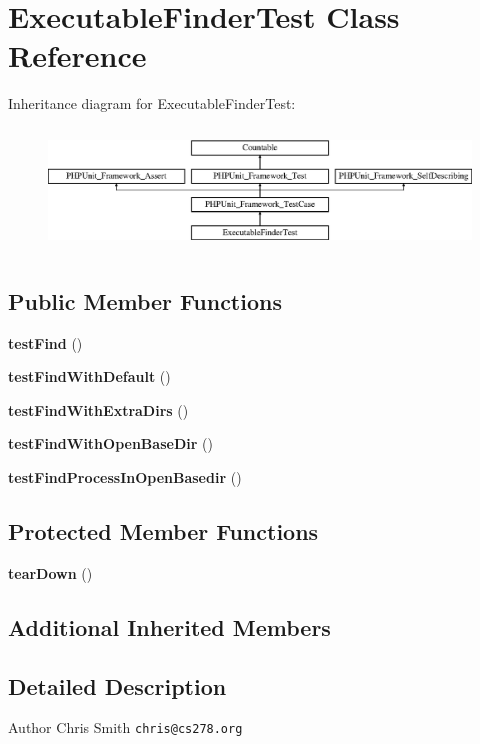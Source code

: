 \section{Executable\+Finder\+Test Class Reference}
\label{class_symfony_1_1_component_1_1_process_1_1_tests_1_1_executable_finder_test}
Inheritance diagram for Executable\+Finder\+Test\+:\begin{figure}[H]
\begin{center}
\leavevmode
\includegraphics[height=3.303835cm]{class_symfony_1_1_component_1_1_process_1_1_tests_1_1_executable_finder_test}
\end{center}
\end{figure}
\subsection*{Public Member Functions}
\begin{DoxyCompactItemize}
\item 
{\bf test\+Find} ()
\item 
{\bf test\+Find\+With\+Default} ()
\item 
{\bf test\+Find\+With\+Extra\+Dirs} ()
\item 
{\bf test\+Find\+With\+Open\+Base\+Dir} ()
\item 
{\bf test\+Find\+Process\+In\+Open\+Basedir} ()
\end{DoxyCompactItemize}
\subsection*{Protected Member Functions}
\begin{DoxyCompactItemize}
\item 
{\bf tear\+Down} ()
\end{DoxyCompactItemize}
\subsection*{Additional Inherited Members}


\subsection{Detailed Description}
\begin{DoxyAuthor}{Author}
Chris Smith {\tt chris@cs278.\+org} 
\end{DoxyAuthor}


